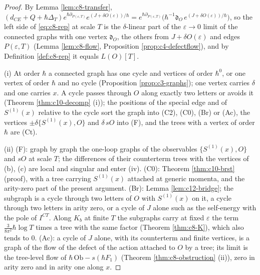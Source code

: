 \begin{proof}
By Lemma \ref{lem:c8-transfer}, $(d_{CE}+Q+\hbar\Delta_T)e^{\hbar\partial_{P(\varepsilon,T)}}e^{(J+\delta O(\varepsilon))/\hbar}=e^{\hbar\partial_{P(\varepsilon,T)}}\big(\hbar^{-1}\mathfrak d_O\,e^{(J+\delta O(\varepsilon))/\hbar}\big)$, so the left side of \eqref{eq:c8-rep} at scale $T$ is the $\delta$-linear part of the $\varepsilon\to0$ limit of the connected graphs with one vertex $\mathfrak d_O$, the others from $J+\delta O(\varepsilon)$ and edges $P(\varepsilon,T)$ (Lemma \ref{lem:c8-flow}, Proposition \ref{prop:c4-defectflow}), and by Definition \ref{def:c8-rep} it equals $L(O)[T]$.

(i) At order $\hbar$ a connected graph has one cycle and vertices of order $\hbar^0$, or one vertex of order $\hbar$ and no cycle (Proposition \ref{prop:c3-graphs}); one vertex carries $\delta$ and one carries $x$. A cycle passes through $O$ along exactly two letters or avoids it (Theorem \ref{thm:c10-decomp} (i)); the positions of the special edge and of $S^{(1)}(x)$ relative to the cycle sort the graph into (C2), (C0), (Br) or (Ac), the vertices $\pm\delta\{S^{(1)}(x),O\}$ and $\delta\,sO$ into (F), and the trees with a vertex of order $\hbar$ are (Ct).

(ii) (F): graph by graph the one-loop graphs of the observables $\{S^{(1)}(x),O\}$ and $sO$ at scale $T$; the differences of their counterterm trees with the vertices of (b), (c) are local and singular and enter (iv). (C0): Theorem \ref{thm:c10-brst} (proof), with a tree carrying $S^{(1)}(x)$ attached at generic momenta, and the arity-zero part of the present argument. (Br): Lemma \ref{lem:c12-bridge}; the subgraph is a cycle through two letters of $O$ with $S^{(1)}(x)$ on it, a cycle through two letters in arity zero, or a cycle of $J$ alone such as the self-energy with the pole of $I^{CT}$. Along $K_b$ at finite $T$ the subgraphs carry at fixed $\varepsilon$ the term $\tfrac3{8\pi^2}\hbar\log T$ times a tree with the same factor (Theorem \ref{thm:c8-K}), which also tends to $0$. (Ac): a cycle of $J$ alone, with its counterterm and finite vertices, is a graph of the flow of the defect of the action attached to $O$ by a tree; its limit is the tree-level flow of $\hbar\,\mathrm{Ob}-s(\hbar F_1)$ (Theorem \ref{thm:c8-obstruction} (ii)), zero in arity zero and in arity one along $x$.


\end{proof}
